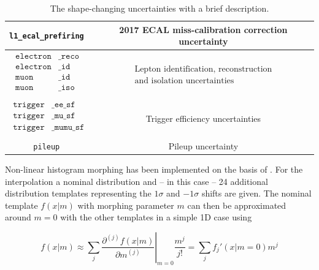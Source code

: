 \begin{table}[h!]
\begin{tabular}{cc}
		\hline
		\texttt{l1\_ecal\_prefiring  } & 2017 ECAL miss-calibration correction uncertainty \\
		
		\hline		
		$\begin{aligned}
			\texttt{electron}&\texttt{\_reco } \\
			\texttt{electron}&\texttt{\_id   } \\
			\texttt{muon}&\texttt{\_id       } \\
			\texttt{muon}&\texttt{\_iso      } \\
		\end{aligned}$         & $\begin{array}{c}
			\text{Lepton identification, reconstruction} \\
			\text{and isolation uncertainties}
		\end{array}$\\
		
		\hline
		$\begin{aligned}
			\texttt{trigger}&\texttt{\_ee\_sf  } \\
			\texttt{trigger}&\texttt{\_mu\_sf  } \\
			\texttt{trigger}&\texttt{\_mumu\_sf} \\
		\end{aligned}$ & Trigger efficiency uncertainties \\
		\hline
		\texttt{pileup               } & Pileup uncertainty \\
	\end{tabular}
	\caption{The shape-changing uncertainties with a brief description.}
	\label{tab:s_sys_table}
\end{table}


Non-linear histogram morphing has been implemented on the basis of \cite{Baak_2015}. For the interpolation a nominal distribution and -- in this case -- 24 additional distribution templates representing the $1\sigma$ and $-1\sigma$ shifts are given. The nominal template $f(x|m)$ with morphing parameter $m$ can then be approximated around $m=0$ with the other templates in a simple 1D case using

\begin{equation*}
	f(x|m) \approx \sum_j \left.\frac{\partial^{(j)} f(x|m)}{\partial m^{(j)}}\right|_{m=0}\frac{m^j}{j!} = \sum_j f_j'(x|m=0) m^j
\end{equation*}




